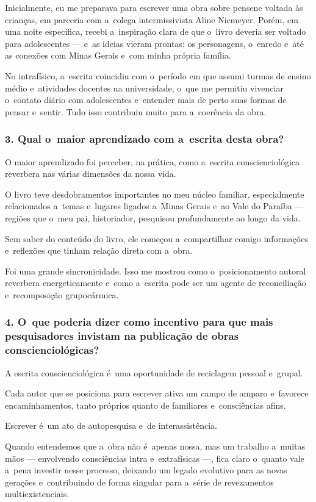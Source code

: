 \documentclass{gescons}
\begin{document}
\begin{multicols}{3}
Inicialmente, eu me preparava para escrever uma obra sobre pensene voltada às crianças, em parceria com a~colega intermissivista Aline Niemeyer. Porém, em uma noite específica, recebi a~inspiração clara de que o~livro deveria ser voltado para adolescentes --- e~as ideias vieram prontas: os personagens, o~enredo e~até as conexões com Minas Gerais e~com minha própria família.

No intrafísico, a~escrita coincidiu com o~período em que assumi turmas de ensino médio e~atividades docentes na universidade, o~que me permitiu vivenciar o~contato diário com adolescentes e~entender mais de perto suas formas de pensar e~sentir. Tudo isso contribuiu muito para a~coerência da obra.

\subsubsection{3. Qual o~maior aprendizado com a~escrita desta obra?}

O maior aprendizado foi perceber, na prática, como a~escrita conscienciológica reverbera nas várias dimensões da nossa vida.

O livro teve desdobramentos importantes no meu núcleo familiar, especialmente relacionados a~temas e~lugares ligados a~Minas Gerais e~ao Vale do Paraíba --- regiões que o~meu pai, historiador, pesquisou profundamente ao longo da vida.

Sem saber do conteúdo do livro, ele começou a~compartilhar comigo informações e~reflexões que tinham relação direta com a~obra.

Foi uma grande sincronicidade. Isso me mostrou como o~posicionamento autoral reverbera energeticamente e~como a~escrita pode ser um agente de reconciliação e~recomposição grupocármica.

\subsubsection{4. O~que poderia dizer como incentivo para que mais pesquisadores invistam na publicação de obras conscienciológicas?}

A escrita conscienciológica é~uma oportunidade de reciclagem pessoal e~grupal.

Cada autor que se posiciona para escrever ativa um campo de amparo e~favorece encaminhamentos, tanto próprios quanto de familiares e~consciências afins.

Escrever é~um ato de autopesquisa e~de interassistência.

Quando entendemos que a~obra não é~apenas nossa, mas um trabalho a~muitas mãos --- envolvendo consciências intra e~extrafísicas ---, fica claro o~quanto vale a~pena investir nesse processo, deixando um legado evolutivo para as novas gerações e~contribuindo de forma singular para a~série de revezamentos multiexistenciais.

    
    \end{multicols}
\end{document}
